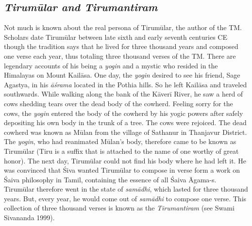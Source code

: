 \subsection*{\textit{Tirumūlar and Tirumantiram}}

Not much is known about the real persona of Tirumūlar, the author of the TM. Scholars date Tirumūlar between late sixth and early seventh centuries CE though the tradition says that he lived for three thousand years and composed one verse each year, thus totaling three thousand verses of the TM. There are legendary accounts of his being a \textit{yogin} and a mystic who resided in the Himalayas on Mount Kailāsa. One day, the \textit{yogin} desired to see his friend, Sage Agastya, in his \textit{āśrama} located in the Pothia hills. So he left Kailāsa and traveled southwards. While walking along the bank of the Kāverī River, he saw a herd of cows shedding tears over the dead body of the cowherd. Feeling sorry for the cows, the \textit{yogin} entered the body of the cowherd by his yogic powers after safely depositing his own body in the trunk of a tree. The cows were rejoiced. The dead cowherd was known as Mūlan from the village of Sathanur in Thanjavur District. The \textit{yogin}, who had reanimated Mūlan’s body, therefore came to be known as Tirumūlar (Tiru is a suffix that is attached to the name of one worthy of great honor). The next day, Tirumūlar could not find his body where he had left it. He was convinced that Śiva wanted Tirumūlar to compose in verse form a work on Śaiva philosophy in Tamil, containing the essence of all Śaiva Āgama-s. Tirumūlar therefore went in the state of \textit{samādhi}, which lasted for three thousand years. But, every year, he would come out of \textit{samādhi} to compose one verse. This collection of three thousand verses is known as the \textit{Tirumantiram} (see Swami Sivananda 1999).

